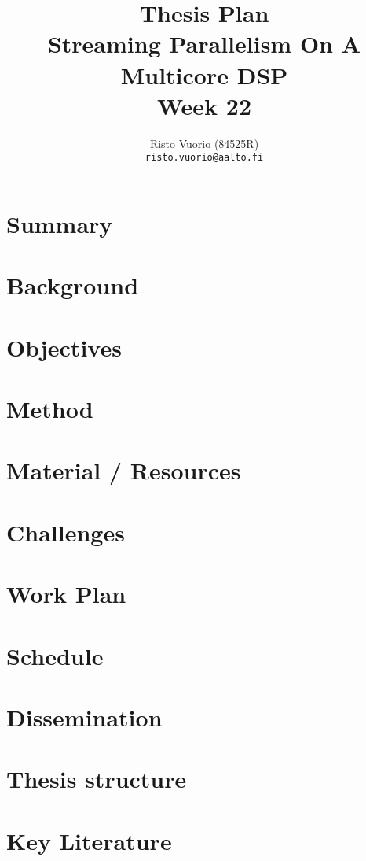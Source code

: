 \documentclass[a4paper,10pt]{article}
\title{Thesis Plan \\
		Streaming Parallelism On A Multicore DSP \\
		Week 22}
\author{Risto Vuorio (84525R) \\
		{\tt risto.vuorio@aalto.fi}}
\begin{document}
\maketitle
\newpage
\tableofcontents
\newpage

\section{Summary}


\section{Background}


\section{Objectives}


\section{Method}


\section{Material / Resources}


\section{Challenges}


\section{Work Plan}


\section{Schedule}


\section{Dissemination}


\pagebreak
\begin{appendices}
  \section{Thesis structure}
  

  \section{Key Literature}
  
\end{appendices}
\end{document}
